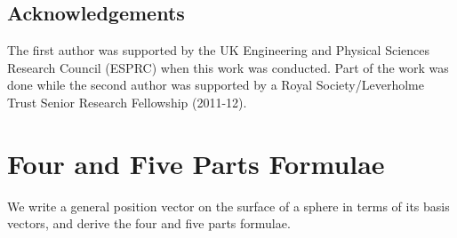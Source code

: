 \documentclass[fleqn,11pt,twoside]{article}
\theoremstyle{definition}
\begin{document}
\subsection*{Acknowledgements}

The first author was supported by the UK Engineering and Physical Sciences Research Council (ESPRC) when this work was conducted.
Part of the work was done while the second author was supported by a Royal Society/Leverholme Trust Senior Research Fellowship (2011-12). 

\appendix

\section{Four and Five Parts Formulae}
\def\theequation{A\arabic{equation}}
\setcounter{equation}{0}

We write a general position vector on the surface of a sphere in terms of its basis vectors, and derive the four and five parts formulae.
\end{document}
